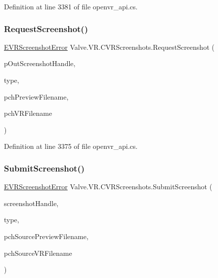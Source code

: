 Definition at line 3381 of file openvr\+\_\+api.\+cs.

\mbox{\label{class_valve_1_1_v_r_1_1_c_v_r_screenshots_a9094b49939eeb56fe471afdaa40e89b9}} 
\subsubsection{\texorpdfstring{RequestScreenshot()}{RequestScreenshot()}}
{\footnotesize\ttfamily \mbox{\hyperlink{namespace_valve_1_1_v_r_ac73c6dcb1af8fe045a626296a21e226b}{E\+V\+R\+Screenshot\+Error}} Valve.\+V\+R.\+C\+V\+R\+Screenshots.\+Request\+Screenshot (\begin{DoxyParamCaption}\item[{ref uint}]{p\+Out\+Screenshot\+Handle,  }\item[{\mbox{\hyperlink{namespace_valve_1_1_v_r_a033ac579445f0992130b11ba62c9b7ae}{E\+V\+R\+Screenshot\+Type}}}]{type,  }\item[{string}]{pch\+Preview\+Filename,  }\item[{string}]{pch\+V\+R\+Filename }\end{DoxyParamCaption})}



Definition at line 3375 of file openvr\+\_\+api.\+cs.

\mbox{\label{class_valve_1_1_v_r_1_1_c_v_r_screenshots_a0da676537255072488496df5f668df07}} 
\subsubsection{\texorpdfstring{SubmitScreenshot()}{SubmitScreenshot()}}
{\footnotesize\ttfamily \mbox{\hyperlink{namespace_valve_1_1_v_r_ac73c6dcb1af8fe045a626296a21e226b}{E\+V\+R\+Screenshot\+Error}} Valve.\+V\+R.\+C\+V\+R\+Screenshots.\+Submit\+Screenshot (\begin{DoxyParamCaption}\item[{uint}]{screenshot\+Handle,  }\item[{\mbox{\hyperlink{namespace_valve_1_1_v_r_a033ac579445f0992130b11ba62c9b7ae}{E\+V\+R\+Screenshot\+Type}}}]{type,  }\item[{string}]{pch\+Source\+Preview\+Filename,  }\item[{string}]{pch\+Source\+V\+R\+Filename }\end{DoxyParamCaption})}



